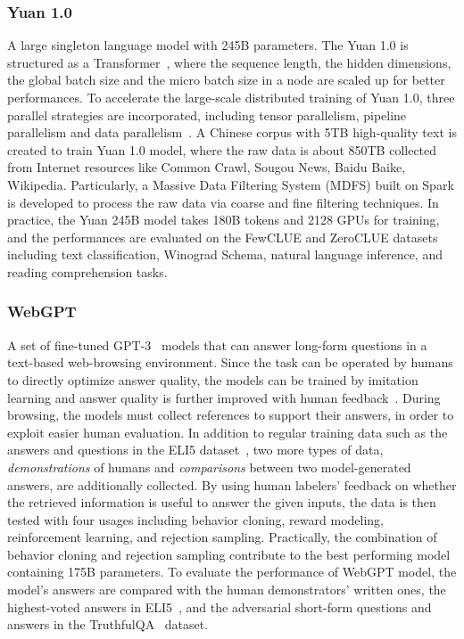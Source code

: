 \subsubsection{Yuan 1.0~\cite{wu2021yuan}}
A large singleton language model with 245B parameters. The Yuan 1.0 is structured as a Transformer~\cite{Transformers}, where the sequence length, the hidden dimensions, the global batch size and the micro batch size in a node are scaled up for better performances. To accelerate the large-scale distributed training of Yuan 1.0, three parallel strategies are incorporated, including tensor parallelism, pipeline parallelism and data parallelism~\cite{shoeybi2019megatron}. A Chinese corpus with 5TB high-quality text is created to train Yuan 1.0 model, where the raw data is about 850TB collected from Internet resources like Common Crawl, Sougou News, Baidu Baike, Wikipedia. Particularly, a Massive Data Filtering System (MDFS) built on Spark is developed to process the raw data via coarse and fine filtering techniques. In practice, the Yuan 245B model takes 180B tokens and 2128 GPUs for training, and the performances are evaluated on the FewCLUE and ZeroCLUE datasets~\cite{xu2020clue} including text classification, Winograd Schema, natural language inference, and reading comprehension tasks.
\subsubsection{WebGPT~\cite{nakano2021webgpt}}
A set of fine-tuned GPT-3~\cite{GPT-3} models that can answer long-form questions in a text-based web-browsing environment. Since the task can be operated by humans to directly optimize answer quality, the models can be trained by imitation learning and answer quality is further improved with human feedback~\cite{stiennon2020learning}. During browsing, the models must collect references to support their answers, in order to exploit easier human evaluation. In addition to regular training data such as the answers and questions in the ELI5 dataset~\cite{fan2019eli5}, two more types of data, \emph{demonstrations} of humans and \emph{comparisons} between two model-generated answers, are additionally collected. By using human labelers' feedback on whether the retrieved information is useful to answer the given inputs, the data is then tested with four usages including behavior cloning, reward modeling, reinforcement learning, and rejection sampling. Practically, the combination of behavior cloning and rejection sampling contribute to the best performing model containing 175B parameters. To evaluate the performance of WebGPT model, the model's answers are compared with the human demonstrators' written ones, the highest-voted answers in ELI5~\cite{fan2019eli5}, and the adversarial short-form questions and answers in the TruthfulQA~\cite{lin2021truthfulqa} dataset.
